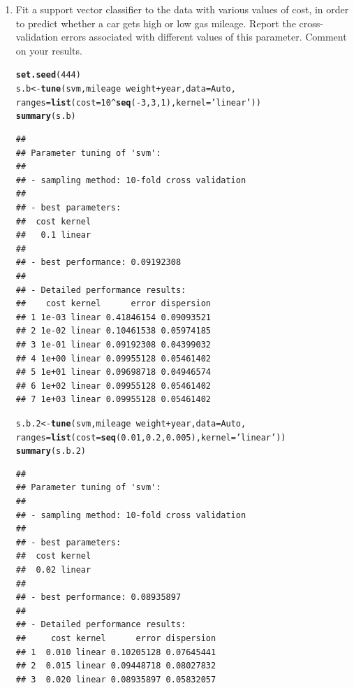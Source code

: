 \documentclass[12pt,fleqn]{article}\usepackage[]{graphicx}\usepackage[]{color}
\makeatletter
\newcommand{\hlnum}[1]{\textcolor[rgb]{0.686,0.059,0.569}{#1}}%
\newcommand{\hlstr}[1]{\textcolor[rgb]{0.192,0.494,0.8}{#1}}%
\newcommand{\hlopt}[1]{\textcolor[rgb]{0,0,0}{#1}}%
\newcommand{\hlstd}[1]{\textcolor[rgb]{0.345,0.345,0.345}{#1}}%
\newcommand{\hlkwb}[1]{\textcolor[rgb]{0.69,0.353,0.396}{#1}}%
\newcommand{\hlkwc}[1]{\textcolor[rgb]{0.333,0.667,0.333}{#1}}%
\newcommand{\hlkwd}[1]{\textcolor[rgb]{0.737,0.353,0.396}{\textbf{#1}}}%
\newenvironment{kframe}{%
 \def\at@end@of@kframe{}%
 \ifinner\ifhmode%
  \def\at@end@of@kframe{\end{minipage}}%
  \begin{minipage}{\columnwidth}%
 \fi\fi%
 \def\FrameCommand##1{\hskip\@totalleftmargin \hskip-\fboxsep
 \colorbox{shadecolor}{##1}\hskip-\fboxsep
     \hskip-\linewidth \hskip-\@totalleftmargin \hskip\columnwidth}%
 \MakeFramed {\advance\hsize-\width
   \@totalleftmargin\z@ \linewidth\hsize
   \@setminipage}}%
 {\par\unskip\endMakeFramed%
 \at@end@of@kframe}
\newenvironment{knitrout}{}{} %
\theoremstyle{definition}
\makeatother
\begin{document}
\begin{enumerate}[1.]
\begin{enumerate}
        \item Fit a support vector classifier to the data with various values of cost, in order to predict whether a car gets high or low gas mileage. Report the cross-validation errors associated with different values of this parameter. Comment on your results.
\begin{knitrout}
\color{fgcolor}\begin{kframe}
\begin{alltt}
\hlkwd{set.seed}\hlstd{(}\hlnum{444}\hlstd{)}
\hlstd{s.b} \hlkwb{<-} \hlkwd{tune}\hlstd{(svm, mileage} \hlopt{~} \hlstd{weight} \hlopt{+} \hlstd{year,} \hlkwc{data} \hlstd{= Auto,}
                 \hlkwc{ranges} \hlstd{=} \hlkwd{list}\hlstd{(}\hlkwc{cost} \hlstd{=} \hlnum{10}\hlopt{^}\hlkwd{seq}\hlstd{(}\hlopt{-}\hlnum{3}\hlstd{,}\hlnum{3}\hlstd{,}\hlnum{1}\hlstd{),} \hlkwc{kernel} \hlstd{=} \hlstr{'linear'}\hlstd{))}
\hlkwd{summary}\hlstd{(s.b)}
\end{alltt}
\begin{verbatim}
## 
## Parameter tuning of 'svm':
## 
## - sampling method: 10-fold cross validation 
## 
## - best parameters:
##  cost kernel
##   0.1 linear
## 
## - best performance: 0.09192308 
## 
## - Detailed performance results:
##    cost kernel      error dispersion
## 1 1e-03 linear 0.41846154 0.09093521
## 2 1e-02 linear 0.10461538 0.05974185
## 3 1e-01 linear 0.09192308 0.04399032
## 4 1e+00 linear 0.09955128 0.05461402
## 5 1e+01 linear 0.09698718 0.04946574
## 6 1e+02 linear 0.09955128 0.05461402
## 7 1e+03 linear 0.09955128 0.05461402
\end{verbatim}
\begin{alltt}
\hlstd{s.b.2} \hlkwb{<-} \hlkwd{tune}\hlstd{(svm, mileage} \hlopt{~} \hlstd{weight} \hlopt{+} \hlstd{year,} \hlkwc{data} \hlstd{= Auto,}
              \hlkwc{ranges} \hlstd{=} \hlkwd{list}\hlstd{(}\hlkwc{cost} \hlstd{=} \hlkwd{seq}\hlstd{(}\hlnum{0.01}\hlstd{,}\hlnum{0.2}\hlstd{,}\hlnum{0.005}\hlstd{),} \hlkwc{kernel} \hlstd{=} \hlstr{'linear'}\hlstd{))}
\hlkwd{summary}\hlstd{(s.b.2)}
\end{alltt}
\begin{verbatim}
## 
## Parameter tuning of 'svm':
## 
## - sampling method: 10-fold cross validation 
## 
## - best parameters:
##  cost kernel
##  0.02 linear
## 
## - best performance: 0.08935897 
## 
## - Detailed performance results:
##     cost kernel      error dispersion
## 1  0.010 linear 0.10205128 0.07645441
## 2  0.015 linear 0.09448718 0.08027832
## 3  0.020 linear 0.08935897 0.05832057

\end{verbatim}
\end{kframe}
\end{knitrout}
\end{enumerate}
\end{enumerate}
\end{document}
